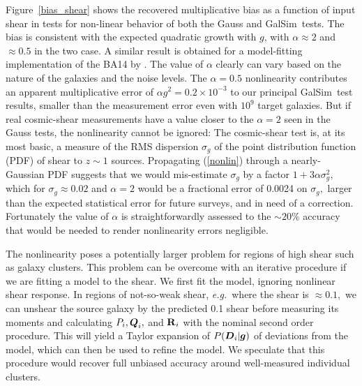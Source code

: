 \documentclass[11pt,preprint,flushrt]{aastex}
\newcommand\eg{{\it e.g.\/}}
\newcommand{\vecD}{\mbox{\boldmath $D$}}
\newcommand{\vecg}{\mbox{\boldmath $g$}}
\newcommand{\vecQ}{\mbox{\boldmath $Q$}}
\newcommand{\matR}{\mbox{$\bf R$}}
\newcommand{\galsim}{{\sc GalSim}}
\newcommand\edit[1]{#1}
\begin{document}
Figure~\ref{bias_shear} shows the recovered multiplicative bias as a
function of input shear in tests for non-linear behavior of both the
Gauss and \galsim\ tests.
The bias is consistent with the expected quadratic growth with $g$,  
with $\alpha\approx2$ and $\approx 0.5$ in
the two case.  A similar result is obtained for a model-fitting
implementation of the BA14 by \citet{ngmix}.
The value of $\alpha$ clearly can vary based on the nature 
of the galaxies and the noise levels.  
\edit{The $\alpha=0.5$ nonlinearity contributes
  an apparent multiplicative error of $\alpha g^2=0.2\times10^{-3}$ to
  our principal \galsim\ test results, smaller than the measurement
  error even with $10^9$ target galaxies.  But if real cosmic-shear
  measurements have a value closer to the $\alpha=2$ seen in the Gauss
  tests, the nonlinearity cannot be ignored:
The cosmic-shear test is, at its most basic, a measure of the
RMS dispersion $\sigma_g$ of the point distribution function (PDF) of shear to
$z\sim1$ sources.  Propagating (\ref{nonlin}) through a
nearly-Gaussian PDF suggests that we would mis-estimate $\sigma_g$ by
a factor $1+3\alpha\sigma_g^2,$ which for $\sigma_g\approx0.02$ and
$\alpha=2$ would be a fractional error of 0.0024 on $\sigma_g,$
larger than the expected statistical error 
for future surveys, and in need of a correction. Fortunately the value
of $\alpha$ is straightforwardly assessed to the $\sim20\%$ accuracy
that would be needed to render nonlinearity errors negligible.}

The nonlinearity poses a potentially larger problem for regions of high shear 
such as galaxy clusters. 
This problem can be overcome with an iterative procedure if we are
fitting a model to the shear. We first fit the model, ignoring
nonlinear shear response.  In regions of not-so-weak shear, \eg\ where
the shear is $\approx0.1,$ we can unshear the source galaxy by the predicted 0.1
shear before measuring its moments and calculating
$P_i, \vecQ_i,$ and $\matR_i$ with the nominal second order
procedure.  This will yield a Taylor expansion of $P(\vecD_i | \vecg)$
of deviations from the model, which can then be used to refine the model.
\edit{We speculate that}
this procedure would recover full unbiased accuracy around
well-measured individual clusters.
\end{document}
